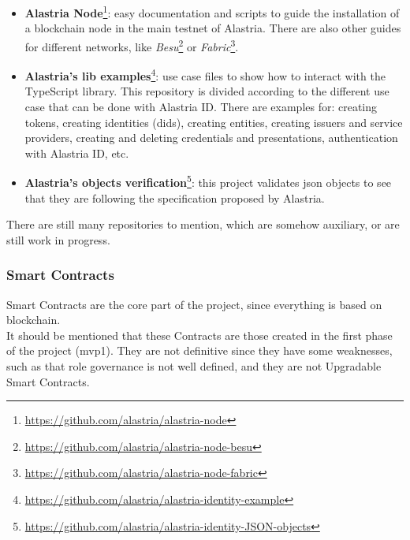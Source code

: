 \documentclass[a4paper, 12pt]{article} %
\begin{document}
        \begin{itemize}
            \item \textbf{Alastria Node}\footnote{\url{https://github.com/alastria/alastria-node}}: easy documentation and scripts to guide the installation of a blockchain node in the main testnet of Alastria. There are also other guides for different networks, like \textit{Besu}\footnote{\url{https://github.com/alastria/alastria-node-besu}} or \textit{Fabric}\footnote{\url{https://github.com/alastria/alastria-node-fabric}}.
            \item \textbf{Alastria's lib examples}\footnote{\url{https://github.com/alastria/alastria-identity-example}}: use case files to show how to interact with the TypeScript library. This repository is divided according to the different use case that can be done with Alastria ID. There are examples for: creating tokens, creating identities (\acrshort{did}s), creating entities, creating issuers and service providers, creating and deleting credentials and presentations, authentication with Alastria ID, etc.
            \item \textbf{Alastria's objects verification}\footnote{\url{https://github.com/alastria/alastria-identity-JSON-objects}}: this project validates \acrshort{json} objects to see that they are following the specification proposed by Alastria.
        \end{itemize}
        There are still many repositories to mention, which are somehow auxiliary, or are still work in progress.
        
        \subsubsection{Smart Contracts}
            Smart Contracts are the core part of the project, since everything is based on blockchain.\\
            
            It should be mentioned that these Contracts are those created in the first phase of the project (\acrshort{mvp}1). They are not definitive since they have some weaknesses, such as that role governance is not well defined, and they are not Upgradable Smart Contracts.\\
            
\end{document}
